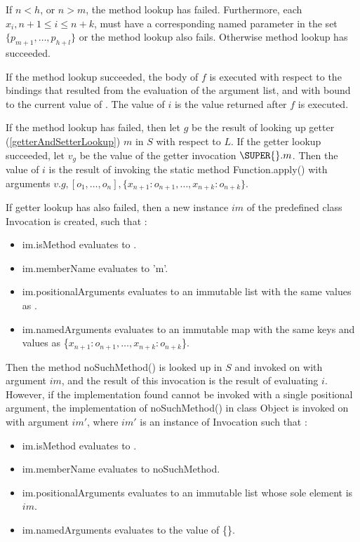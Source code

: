 \documentclass{article}
\newcommand{\code}[1]{{\sf #1}}
\begin{document}
\LMHash{}
If  $n < h$, or $n > m$, the method lookup has failed. Furthermore, each $x_i, n+1 \le i \le n+k$,  must have a corresponding named parameter in the set $\{p_{m+1}, \ldots, p_{h+l}\}$ or the method lookup also fails.  Otherwise method lookup has succeeded.

\LMHash{}
If the method lookup succeeded, the body of $f$ is executed with respect to the bindings that resulted from the evaluation of the argument list, and with \THIS{} bound to the current value of \THIS{}. The value of $i$ is the value returned after $f$ is executed.

\LMHash{}
If the method lookup has failed, then let $g$ be the result of looking up getter (\ref{getterAndSetterLookup}) $m$ in $S$ with respect to $L$. If the getter lookup succeeded, let $v_g$ be the value of the getter invocation $\SUPER{}.m$. Then the value of $i$ is the result of invoking 
the static method \code{Function.apply()} with arguments $v.g, [o_1, \ldots , o_n], \{x_{n+1}: o_{n+1}, \ldots , x_{n+k}: o_{n+k}\}$.
 
\LMHash{}
If  getter lookup has also failed, then a new instance $im$  of the predefined class  \code{Invocation}  is created, such that :
\begin{itemize}
\item  \code{im.isMethod} evaluates to \code{\TRUE{}}.
\item  \code{im.memberName} evaluates to \code{'m'}.
\item \code{im.positionalArguments} evaluates to an immutable list with the same  values as  \code{[$o_1, \ldots, o_n$]}.
\item \code{im.namedArguments} evaluates to an immutable map with the same keys and values as \code{\{$x_{n+1}: o_{n+1}, \ldots, x_{n+k} : o_{n+k}$\}}.
\end{itemize}
Then the method \code{noSuchMethod()} is looked up in $S$ and invoked on \THIS{} with argument $im$, and the result of this invocation is the result of evaluating $i$. However, if the implementation found cannot be invoked with a single positional argument, the implementation  of \code{noSuchMethod()} in class \code{Object} is invoked on \THIS{} with argument $im'$, where $im'$ is an instance of \code{Invocation} such that :
\begin{itemize}
\item  \code{im.isMethod} evaluates to \code{\TRUE{}}.
\item  \code{im.memberName} evaluates to \code{noSuchMethod}.
\item \code{im.positionalArguments} evaluates to an immutable list whose sole element is  $im$.
\item \code{im.namedArguments} evaluates to the value of \code{\CONST{} \{\}}.
\end{itemize}
\end{document}
